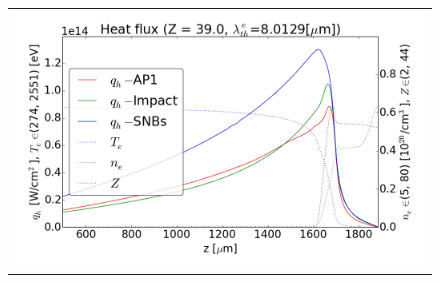 

\begin{figure}[tbh]
  \begin{center}
    \begin{tabular}{c}
      \includegraphics[width=\figscale\textwidth]{../VFPdata/GD_Hohlraum/fluxes_10ps.png} 
    \end{tabular}
  \caption{
  }
  \label{fig:Gd_VFP_10ps_heatflux}
  \end{center} 
\end{figure}

